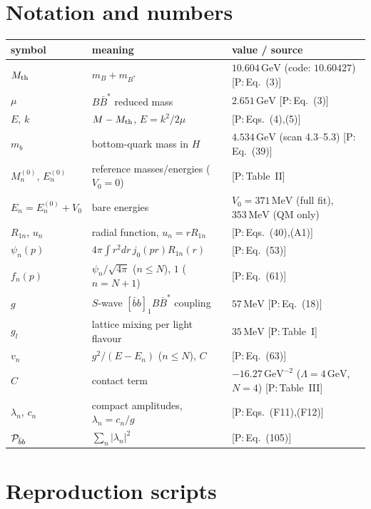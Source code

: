 \documentclass[11pt,a4paper]{article}
\newcommand{\tagP}[1]{\textcolor{blue!65!black}{\textsf{\small[P:\,#1]}}}
\newcommand{\BBst}{B\bar B^*}
\newcommand{\Mth}{M_{\rm th}}
\newcommand{\Pbb}{{\cal P}_{\bar bb}}
\newcommand{\GeV}{\,\mathrm{GeV}}
\newcommand{\MeV}{\,\mathrm{MeV}}
\begin{document}
\appendix

\section{Notation and numbers}

\begin{center}
\small
\begin{tabular}{lll}
\toprule
symbol & meaning & value / source\\
\midrule
$\Mth$ & $m_B+m_{B^*}$ & $10.604\GeV$ (code: $10.60427$) \tagP{Eq.~(3)}\\
$\mu$ & $\BBst$ reduced mass & $2.651\GeV$ \tagP{Eq.~(3)}\\
$E$, $k$ & $M-\Mth$, $E=k^2/2\mu$ & \tagP{Eqs.~(4),(5)}\\
$m_b$ & bottom-quark mass in $H$ & $4.534\GeV$ (scan 4.3--5.3) \tagP{Eq.~(39)}\\
$M_n^{(0)}$, $E_n^{(0)}$ & reference masses/energies ($V_0=0$) & \tagP{Table~II}\\
$E_n=E_n^{(0)}+V_0$ & bare energies & $V_0=371\MeV$ (full fit), $353\MeV$ (QM only)\\
$R_{1n}$, $u_n$ & radial function, $u_n=rR_{1n}$ & \tagP{Eqs.~(40),(A1)}\\
$\psi_n(p)$ & $4\pi\int r^2dr\,j_0(pr)R_{1n}(r)$ & \tagP{Eq.~(53)}\\
$f_n(p)$ & $\psi_n/\sqrt{4\pi}$ ($n\le N$), $1$ ($n=N+1$) & \tagP{Eq.~(61)}\\
$g$ & $S$-wave $[\bar bb]_1\BBst$ coupling & $57\MeV$ \tagP{Eq.~(18)}\\
$g_l$ & lattice mixing per light flavour & $35\MeV$ \tagP{Table~I}\\
$v_n$ & $g^2/(E-E_n)$ ($n\le N$), $C$ & \tagP{Eq.~(63)}\\
$C$ & contact term & $-16.27\GeV^{-2}$ ($\Lambda=4\GeV$, $N=4$) \tagP{Table~III}\\
$\lambda_n$, $c_n$ & compact amplitudes, $\lambda_n=c_n/g$ & \tagP{Eqs.~(F11),(F12)}\\
$\Pbb$ & $\sum_n|\lambda_n|^2$ & \tagP{Eq.~(105)}\\
\bottomrule
\end{tabular}
\end{center}

\section{Reproduction scripts}
\end{document}
